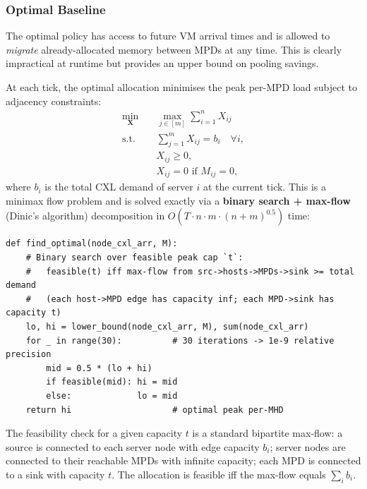 \documentclass[11pt]{article}
\begin{document}
\subsubsection*{Optimal Baseline}

The optimal policy has access to future VM arrival times and is allowed to
\emph{migrate} already-allocated memory between MPDs at any time.  This is
clearly impractical at runtime but provides an upper bound on pooling savings.

At each tick, the optimal allocation minimises the peak per-MPD load subject
to adjacency constraints:
\begin{equation}
\begin{aligned}
\min_{\mathbf{X}} \quad & \max_{j \in [m]} \sum_{i=1}^{n} X_{ij} \\
\text{s.t.} \quad & \sum_{j=1}^{m} X_{ij} = b_i \quad \forall i, \\
                  & X_{ij} \ge 0, \\
                  & X_{ij} = 0 \text{ if } M_{ij} = 0,
\end{aligned}
\label{eq:opt}
\end{equation}
where $b_i$ is the total CXL demand of server $i$ at the current tick.
This is a minimax flow problem and is solved exactly via a
\textbf{binary search + max-flow} (Dinic's algorithm) decomposition in
$O(T \cdot n \cdot m \cdot (n + m)^{0.5})$ time:

\begin{lstlisting}[caption={Optimal allocation via binary search on peak load.}]
def find_optimal(node_cxl_arr, M):
    # Binary search over feasible peak cap `t`:
    #   feasible(t) iff max-flow from src->hosts->MPDs->sink >= total demand
    #   (each host->MPD edge has capacity inf; each MPD->sink has capacity t)
    lo, hi = lower_bound(node_cxl_arr, M), sum(node_cxl_arr)
    for _ in range(30):          # 30 iterations -> 1e-9 relative precision
        mid = 0.5 * (lo + hi)
        if feasible(mid): hi = mid
        else:             lo = mid
    return hi                    # optimal peak per-MHD
\end{lstlisting}

The feasibility check for a given capacity $t$ is a standard bipartite
max-flow: a source is connected to each server node with edge capacity
$b_i$; server nodes are connected to their reachable MPDs with infinite
capacity; each MPD is connected to a sink with capacity $t$.
The allocation is feasible iff the max-flow equals $\sum_i b_i$.
\end{document}
